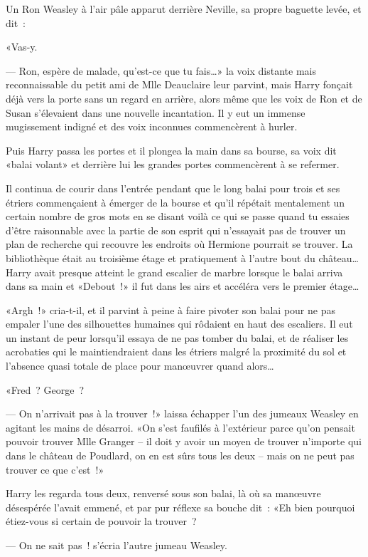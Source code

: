 Un Ron Weasley à l'air pâle apparut derrière Neville, sa propre baguette levée, et dit~:

«Vas-y.

--- Ron, espère de malade, qu'est-ce que tu fais…» la voix distante mais reconnaissable du petit ami de Mlle Deauclaire leur parvint, mais Harry fonçait déjà vers la porte sans un regard en arrière, alors même que les voix de Ron et de Susan s'élevaient dans une nouvelle incantation. Il y eut un immense mugissement indigné et des voix inconnues commencèrent à hurler.

Puis Harry passa les portes et il plongea la main dans sa bourse, sa voix dit «balai volant» et derrière lui les grandes portes commencèrent à se refermer.

Il continua de courir dans l'entrée pendant que le long balai pour trois et ses étriers commençaient à émerger de la bourse et qu'il répétait mentalement un certain nombre de gros mots en se disant voilà ce qui se passe quand tu essaies d'être raisonnable avec la partie de son esprit qui n'essayait pas de trouver un plan de recherche qui recouvre les endroits où Hermione pourrait se trouver. La bibliothèque était au troisième étage et pratiquement à l'autre bout du château… Harry avait presque atteint le grand escalier de marbre lorsque le balai arriva dans sa main et «Debout~!» il fut dans les airs et accéléra vers le premier étage…

«Argh~!» cria-t-il, et il parvint à peine à faire pivoter son balai pour ne pas empaler l'une des silhouettes humaines qui rôdaient en haut des escaliers. Il eut un instant de peur lorsqu'il essaya de ne pas tomber du balai, et de réaliser les acrobaties qui le maintiendraient dans les étriers malgré la proximité du sol et l'absence quasi totale de place pour manœuvrer quand alors…

«Fred~? George~?

--- On n'arrivait pas à la trouver~!» laissa échapper l'un des jumeaux Weasley en agitant les mains de désarroi. «On s'est faufilés à l'extérieur parce qu'on pensait pouvoir trouver Mlle Granger -- il doit y avoir un moyen de trouver n'importe qui dans le château de Poudlard, on en est sûrs tous les deux -- mais on ne peut pas trouver ce que c'est~!»

Harry les regarda tous deux, renversé sous son balai, là où sa manœuvre désespérée l'avait emmené, et par pur réflexe sa bouche dit~: «Eh bien pourquoi étiez-vous si certain de pouvoir la trouver~?

--- On ne sait pas~! s'écria l'autre jumeau Weasley.

